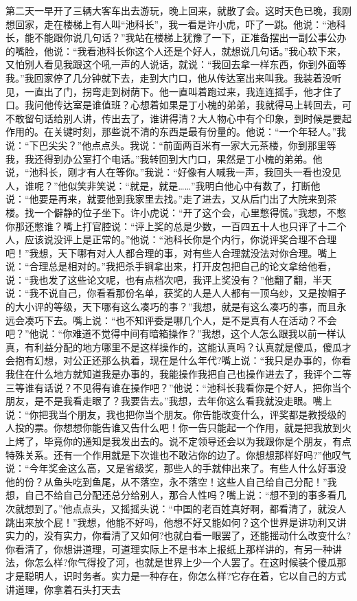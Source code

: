 \documentclass[12pt,oneside]{book}
\begin{document}
第二天一早开了三辆大客车出去游玩，晚上回来，就散了会。这时天色已晚，我刚想回家，走在楼梯上有人叫``池科长''，我一看是许小虎，吓了一跳。他说：``池科长，能不能跟你说几句话？''我站在楼梯上犹豫了一下，正准备摆出一副公事公办的嘴脸，他说：``我看池科长你这个人还是个好人，就想说几句话。''我心软下来，又怕别人看见我跟这个吼一声的人说话，就说：``我回去拿一样东西，你到外面等我。''我回家停了几分钟就下去，走到大门口，他从传达室出来叫我。我装着没听见，一直出了门，拐弯走到树荫下。他一直叫着跑过来，我连连摇手，他才住了口。我问他传达室是谁值班？心想着如果是丁小槐的弟弟，我就得马上转回去，可不敢留句话给别人讲，传出去了，谁讲得清？大人物心中有个印象，到时候是要起作用的。在关键时刻，那些说不清的东西是最有份量的。他说：``一个年轻人。''我说：``下巴尖尖？''他点点头。我说：``前面两百米有一家大元茶楼，你到那里等我，我还得到办公室打个电话。''我转回到大门口，果然是丁小槐的弟弟。他说，``池科长，刚才有人在等你。''我说：``好像有人喊我一声，我回头一看也没见人，谁呢？''他似笑非笑说：``就是，就是\ldots\ldots{}''我明白他心中有数了，打断他说：``他要是再来，就要他到我家里去找。''走了进去，又从后门出了大院来到茶楼。找一个僻静的位子坐下。许小虎说：``开了这个会，心里憋得慌。''我想，不憋你那还憋谁？嘴上打官腔说：``评上奖的总是少数，一百四五十人也只评了十二个人，应该说没评上是正常的。''他说：``池科长你是个内行，你说评奖合理不合理吧！''我想，天下哪有对人人都合理的事，对有些人合理就没法对你合理。嘴上说：``合理总是相对的。''我把杀手锏拿出来，打开皮包把自己的论文拿给他看，说：``我也发了这些论文呢，也有点档次吧，我评上奖没有？''他翻了翻，半天说：``我不说自己，你看看那份名单，获奖的人是人人都有一顶乌纱，又是按帽子的大小评的等级，天下哪有这么凑巧的事？''我想，就是有这么凑巧的事，而且永远会凑巧下去。嘴上说：``也不知评委是哪几个人，是不是真有人在活动？不会吧？''他说：``你难道不觉得中间有暗箱操作？''我想，这个人怎么跟我以前一样认真，有利益分配的地方哪里不是这样操作的，这能认真吗？认真就是傻瓜，傻瓜才会抱有幻想，对公正还那么执着，现在是什么年代?嘴上说：``我只是办事的，你看我住在什么地方就知道我是办事的，我能操作我把自己也操作进去了，我评个二等三等谁有话说？不见得有谁在操作吧？''他说：``池科长我看你是个好人，把你当个朋友，是不是我看走眼了？我要告去。''我想，去年你这么看我就没走眼。嘴上说：``你把我当个朋友，我也把你当个朋友。你告能改变什么，评奖都是教授级的人投的票。你想想你能告谁又告什么吧！你一告只能起一个作用，就是把我放到火上烤了，毕竟你的通知是我发出去的。说不定领导还会以为我跟你是个朋友，有点特殊关系。还有一个作用就是下次谁也不敢沾你的边了。你想想那样好吗?''他叹气说：``今年奖金这么高，又是省级奖，那些人的手就伸出来了。有些人什么好事没他的份？从鱼头吃到鱼尾，从不落空，永不落空！这些人自己给自己分配！''我想，自己不给自己分配还总分给别人，那合人性吗？嘴上说：``想不到的事多看几次就想到了。''他点点头，又摇摇头说：``中国的老百姓真好啊，都看清了，就没人跳出来放个屁！''我想，他能不好吗，他想不好又能如何？这个世界是讲功利又讲实力的，没有实力，你看清了又如何?也就白看一眼罢了，还能摇动什么改变什么?你看清了，你想讲道理，可道理实际上不是书本上报纸上那样讲的，有另一种讲法，你怎么样?你气得投了河，也就是世界上少一个人罢了。在这时候装个傻瓜那才是聪明人，识时务者。实力是一种存在，你怎么样?它存在着，它以自己的方式讲道理，你拿着石头打天去
\end{document}
